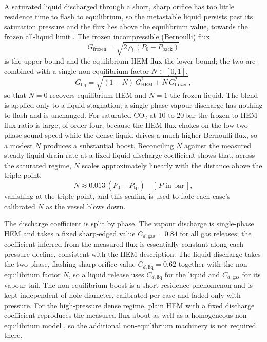 \documentclass[5p,authoryear]{elsarticle}
\begin{document}
A saturated liquid discharged through a short, sharp orifice has too little residence time to flash
to equilibrium, so the metastable liquid persists past its saturation pressure and the flux lies
above the equilibrium value, towards the frozen all-liquid limit \citep{Fauske1988, HenryFauske1971}. The
frozen incompressible (Bernoulli) flux
\begin{equation}
\label{eq:frozen}
G_\text{frozen} = \sqrt{2\,\rho_l\,(P_0 - P_\text{back})}
\end{equation}
is the upper bound and the equilibrium HEM flux the lower bound; the two are combined with a single
non-equilibrium factor $N \in [0,1]$,
\begin{equation}
\label{eq:hne}
G_\text{liq} = \sqrt{(1-N)\,G_\text{HEM}^2 + N\,G_\text{frozen}^2},
\end{equation}
so that $N = 0$ recovers equilibrium HEM and $N = 1$ the frozen liquid. The blend is applied only
to a liquid stagnation; a single-phase vapour discharge has nothing to flash and is unchanged. For
saturated CO$_2$ at 10 to 20\,bar the frozen-to-HEM flux ratio is large, of order four, because the
HEM flux chokes on the low two-phase sound speed while the dense liquid drives a much higher
Bernoulli flux, so a modest $N$ produces a substantial boost. Reconciling $N$ against the measured
steady liquid-drain rate at a fixed liquid discharge coefficient shows that, across the saturated
regime, $N$ scales approximately linearly with the distance above the triple point,
\begin{equation}
\label{eq:nofp}
N \approx 0.013\,(P_0 - P_\text{tp}) \quad [\,P \text{ in bar}\,],
\end{equation}
vanishing at the triple point, and this scaling is used to fade each case's calibrated $N$ as the
vessel blows down.

The discharge coefficient is split by phase. The vapour discharge is single-phase HEM and takes a
fixed sharp-edged value $C_{d,\text{gas}} = 0.84$ for all gas releases; the coefficient inferred from
the measured flux is essentially constant along each pressure decline, consistent with the HEM
description. The liquid
discharge takes the two-phase, flashing sharp-orifice value $C_{d,\text{liq}} = 0.62$
\citep{Darby2004} together with the non-equilibrium factor $N$, so a liquid release uses
$C_{d,\text{liq}}$ for the liquid and $C_{d,\text{gas}}$ for its vapour tail. The non-equilibrium
boost is a short-residence phenomenon and is kept independent of hole diameter, calibrated per case
and faded only with pressure. For the
high-pressure dense regime, plain HEM with a fixed discharge coefficient reproduces the measured
flux about as well as a homogeneous non-equilibrium model \citep{Lopes2018, Hammer2022}, so the
additional non-equilibrium machinery is not required there.
\end{document}
